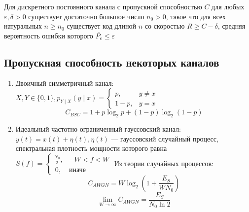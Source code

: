 \begin{theorem}[прямая]
    Для дискретного постоянного канала с пропускной способностью \(C\) для любых \(\varepsilon, \delta > 0\) существует достаточно большое число \(n_0 > 0\), такое что для всех натуральных \(n \ge n_0\) существует код длиной \(n\) со скоростью \(R \ge C - \delta\), средняя вероятность ошибки которого \(\overline{P_e} \le \varepsilon\)
\end{theorem}

\subsection{Пропускная способность некоторых каналов}

\begin{enumerate}
    \item Двоичный симметричный канал: \(X, Y \in \{0, 1\}, p_{Y \mid X}(y \mid x) = \begin{cases}
              p,      & y \neq x \\
              1 - p , & y = x
          \end{cases}\)
          \[C_{BSC} = 1 + p \log_2 p + (1 - p) \log_2(1 - p)\]
    \item Идеальный частотно ограниченный гауссовский канал: \(y(t) = x(t) + \eta(t), \eta(t)\) --- гауссовский случайный процесс, спектральная плотность мощности которого равна \(S(f) = \begin{cases}
              \frac{N_0}{2}, & -W < f < W   \\\
              0,             & \text{иначе}
          \end{cases}\)
          Из теории случайных процессов:
          \[C_{AWGN} = W \log_2 \left(1 + \frac{E_S}{WN_0}\right)\]
          \[\lim_{W \to \infty} C_{AWGN} = \frac{E_S}{N_0 \ln 2}\]
\end{enumerate}
